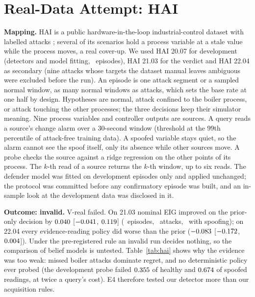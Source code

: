 \documentclass[conference]{IEEEtran}
\begin{document}
\section{Real-Data Attempt: HAI}\label{sec:hai}

\textbf{Mapping.} HAI is a public hardware-in-the-loop industrial-control dataset with labelled attacks
\cite{shin2020hai,shin2021hai}; several of its scenarios hold a process variable at a stale value while the process
moves, a real cover-up. We used HAI 20.07 for development (detectors and model fitting, \numVndev\ episodes), HAI 21.03
for the verdict and HAI 22.04 as secondary (nine attacks whose targets the dataset manual leaves ambiguous were
excluded before the run). An episode is one attack segment or a sampled normal window, as many normal windows as
attacks, which sets the base rate at one half by design. Hypotheses are normal, attack confined to the boiler process,
or attack touching the other processes; the three decisions keep their simulator meaning. Nine process variables and
controller outputs are sources. A query reads a source's change alarm over a 30-second window (threshold at the 99th
percentile of attack-free training data). A spoofed variable stays quiet, so the alarm cannot see the spoof itself, only
its absence while other sources move. A probe checks the source against a ridge regression on the other points of its
process. The $k$-th read of a source returns the $k$-th window, up to six reads. The defender model was fitted on
development episodes only and applied unchanged; the protocol was committed before any confirmatory episode was built,
and an in-sample look at the development data was disclosed in it.

\textbf{Outcome: invalid.} V-real failed. On 21.03 nominal EIG improved on the prior-only decision by $0.040$
[$-0.041$, $0.119$] (\numVnA\ episodes, \numVattA\ attacks, \numVspA\ with spoofing); on 22.04 every
evidence-reading policy did worse than the prior ($-0.083$ [$-0.172$, $0.004$]). Under the pre-registered
rule an invalid run decides nothing, so the comparison of belief models is untested. Table~\ref{tab:hai} shows why the
evidence was too weak: missed boiler attacks dominate regret, and no deterministic policy ever probed (the development
probe failed $0.355$ of healthy and $0.674$ of spoofed readings, at twice a query's cost). E4 therefore tested
our detector more than our acquisition rules.
\end{document}

